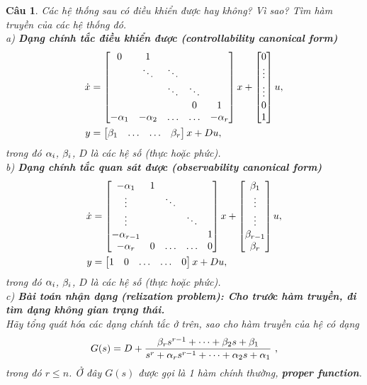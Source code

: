 \documentclass[11pt]{article}
\newtheorem{bt}{Câu}
\begin{document}
\begin{bt} Các hệ thống sau có điều khiển được hay không? Vì sao? Tìm hàm truyền của các hệ thống đó. \\
a) \textbf{Dạng chính tắc điều khiển được (controllability canonical form)}
%
\begin{align}
	\dot{x} &= \begin{bmatrix} 0 & 1 & &  & \\ &  \ddots & \ddots &  & \\ & & \ddots & \ddots &   \\&  &  & 0 & 1 \\ -\alpha_1 & -\alpha_2 & \dots & \dots & -\alpha_{r}  \end{bmatrix} x + \begin{bmatrix} 0 \\ \vdots \\ \vdots \\ 0 \\ 1 \end{bmatrix} u, \\
y &= \begin{bmatrix} \beta_1 &  \dots & \dots & \beta_r \end{bmatrix} x + D u, 
\end{align}
%
trong đó $\alpha_i$, $\beta_i$, $D$ là các hệ số (thực hoặc phức). \\
b) \textbf{Dạng chính tắc quan sát được (observability canonical form)}
%
\begin{align}
	\dot{x} &= \begin{bmatrix} -\alpha_1 & 1 & &  & \\ \vdots &   & \ddots &  & \\ \vdots & & & \ddots &   \\ -\alpha_{r-1} &  &  &  & 1 \\ -\alpha_{r} & 0 & \dots & \dots & 0 \end{bmatrix} x + \begin{bmatrix} \beta_1 \\  \vdots \\ \vdots \\ \beta_{r-1} \\ \beta_r \end{bmatrix} u, \\
y &= \begin{bmatrix} 1 &  0 & \dots & \dots & 0 \end{bmatrix} x + D u, 
\end{align}
%
trong đó $\alpha_i$, $\beta_i$, $D$ là các hệ số (thực hoặc phức). \\
c) \textbf{Bài toán nhận dạng (relization problem): Cho trước hàm truyền, đi tìm dạng không gian trạng thái.} \\
Hãy tổng quát hóa các dạng chính tắc ở trên, sao cho hàm truyền của hệ có dạng 
%
\begin{equation}
	G(s) = D + \dfrac{\b_r s^{r-1} + \dots + \b_2 s + \b_1}{s^r + \a_r s^{r-1} + \dots + \a_{2} s + \a_1} \ ,
\end{equation}
%
trong đó $r \leq n$. Ở đây $G(s)$ được gọi là 1 hàm chính thường, \textbf{proper function}.
\end{bt}
\end{document}
